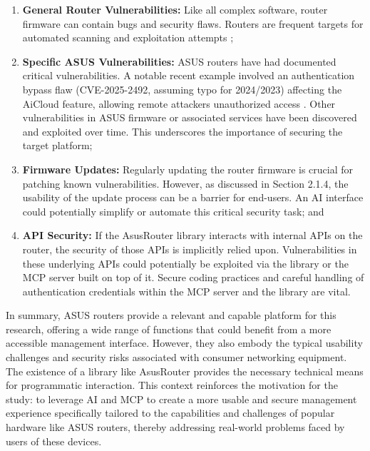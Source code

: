 \begin{enumerate}
\item \textbf{General Router Vulnerabilities:} Like all complex software, router firmware can contain bugs and security flaws. Routers are frequent targets for automated scanning and exploitation attempts \cite{router_exploitable};

\item \textbf{Specific ASUS Vulnerabilities:} ASUS routers have had documented critical vulnerabilities. A notable recent example involved an authentication bypass flaw (CVE-2025-2492, assuming typo for 2024/2023) affecting the AiCloud feature, allowing remote attackers unauthorized access \cite{secure_router}. Other vulnerabilities in ASUS firmware or associated services have been discovered and exploited over time. This underscores the importance of securing the target platform;

\item \textbf{Firmware Updates:} Regularly updating the router firmware is crucial for patching known vulnerabilities. However, as discussed in Section 2.1.4, the usability of the update process can be a barrier for end-users. An AI interface could potentially simplify or automate this critical security task; and

\item \textbf{API Security:} If the AsusRouter library interacts with internal APIs on the router, the security of those APIs is implicitly relied upon. Vulnerabilities in these underlying APIs could potentially be exploited via the library or the MCP server built on top of it. Secure coding practices and careful handling of authentication credentials within the MCP server and the library are vital.
\end{enumerate}

In summary, ASUS routers provide a relevant and capable platform for this research, offering a wide range of functions that could benefit from a more accessible management interface. However, they also embody the typical usability challenges and security risks associated with consumer networking equipment. The existence of a library like AsusRouter provides the necessary technical means for programmatic interaction. This context reinforces the motivation for the study: to leverage AI and MCP to create a more usable and secure management experience specifically tailored to the capabilities and challenges of popular hardware like ASUS routers, thereby addressing real-world problems faced by users of these devices.

